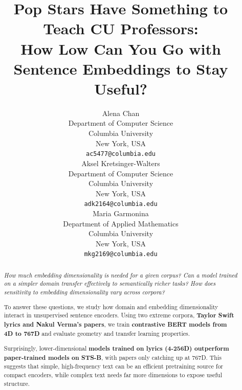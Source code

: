 \documentclass{article}
\title{Pop Stars Have Something to Teach CU Professors: \\
\large{How Low Can You Go with Sentence Embeddings to Stay Useful?}}
\begin{document}
\author{
  Alena Chan \\
  Department of Computer Science \\
  Columbia University \\
  New York, USA \\
  \texttt{ac5477@columbia.edu} \\
  \And
  Aksel Kretsinger-Walters \\
  Department of Computer Science \\
  Columbia University \\
  New York, USA \\
  \texttt{adk2164@columbia.edu} \\
  \And
  Maria Garmonina \\
  Department of Applied Mathematics \\
  Columbia University \\
  New York, USA \\
  \texttt{mkg2169@columbia.edu} \\
}

\maketitle

\begin{abstract}
		\textit{How much embedding dimensionality is needed for a given corpus? Can a model
				trained on a simpler domain transfer effectively to semantically richer tasks? How does sensitivity to
		embedding dimensionality vary across corpora?}

		To answer these questions, we study how domain and embedding dimensionality interact in
		unsupervised sentence encoders. Using two extreme corpora, \textbf{Taylor Swift lyrics
		and Nakul Verma's papers}, we train \textbf{contrastive BERT models from 4D to 767D}
		and evaluate geometry and transfer learning properties.

		Surprisingly, lower-dimensional \textbf{models trained on lyrics (4-256D) outperform
		paper-trained models on STS-B}, with papers only catching up at 767D. This suggests
		that simple, high-frequency text can be an efficient pretraining source for compact
		encoders, while complex text needs far more dimensions to expose useful structure.
\end{abstract}
\end{document}
